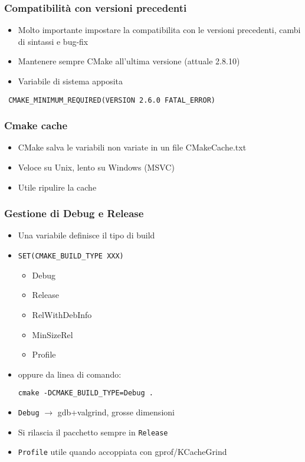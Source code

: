 \documentclass[12pt] {beamer}
\begin{document}
\begin{frame}[fragile]
\frametitle{Compatibilità con versioni precedenti}
\begin{itemize}
\item Molto importante impostare la compatibilita con le versioni precedenti, cambi di sintassi e bug-fix
\item Mantenere sempre CMake all'ultima versione (attuale 2.8.10)
\item Variabile di sistema apposita
\end{itemize}
\begin{verbatim}
 CMAKE_MINIMUM_REQUIRED(VERSION 2.6.0 FATAL_ERROR)
\end{verbatim}
\end{frame}

\begin{frame}
\frametitle{Cmake cache}
\begin{itemize}
\item CMake salva le variabili non variate in un file CMakeCache.txt
\item Veloce su Unix, lento su Windows (MSVC)
\item Utile ripulire la cache
\end{itemize}	
\end{frame}

\begin{frame}[fragile]
\frametitle{Gestione di Debug e Release}
\begin{itemize}
\item Una variabile definisce il tipo di build
\item
\begin{verbatim}
SET(CMAKE_BUILD_TYPE XXX)
\end{verbatim}
    \begin{itemize}
    \item Debug
    \item Release
    \item RelWithDebInfo
    \item MinSizeRel
    \item Profile
    \end{itemize}
\item oppure da linea di comando:
\begin{verbatim}
cmake -DCMAKE_BUILD_TYPE=Debug .
\end{verbatim}

\item \texttt{Debug} $\rightarrow$ gdb+valgrind, grosse dimensioni
\item Si rilascia il pacchetto sempre in \texttt{Release}
\item \texttt{Profile} utile quando accoppiata con gprof/KCacheGrind
\end{itemize}
\end{frame}
\end{document}
